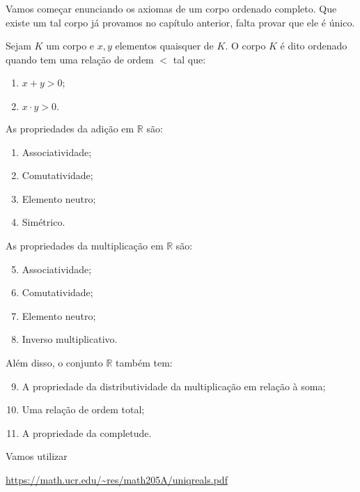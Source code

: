 \documentclass[../main.tex]{subfiles}
\begin{document}
Vamos começar enunciando os axiomas de um corpo ordenado completo. Que existe um tal corpo já provamos no capítulo anterior, falta provar que ele é único.

\begin{defi}\label{enum-def-corpoOrdenado}
    Sejam $K$ um corpo e $x,y$ elementos quaisquer de $K$. O corpo $K$ é dito ordenado quando tem uma relação de ordem $<$ tal que: 
    \begin{enumerate}[label=(\roman*)]
        \item $x+y > 0$;
        \item $x \cdot y > 0.$
    \end{enumerate}
\end{defi}

As propriedades da adição em $\mathbb{R}$ são:
\begingroup
\renewcommand\labelenumi{A\theenumi.}
\begin{enumerate}
    \item Associatividade;
    \item Comutatividade;
    \item Elemento neutro;
    \item Simétrico.
\end{enumerate}

As propriedades da multiplicação em $\mathbb{R}$ são:
\renewcommand\labelenumi{M\theenumi.}
\begin{enumerate}
    \setcounter{enumi}{4}
    \item Associatividade;
    \item Comutatividade;
    \item Elemento neutro;
    \item Inverso multiplicativo.
\end{enumerate}
Além disso, o conjunto $\mathbb{R}$ também tem:
\renewcommand\labelenumi{P\theenumi.}
\begin{enumerate}
\setcounter{enumi}{8}
    \item A propriedade da distributividade da multiplicação em relação à soma;
    \item Uma relação de ordem total;
    \item A propriedade da completude.
\end{enumerate}
\endgroup

\begin{obs}
    Vamos utilizar 
\end{obs}
\url{https://math.ucr.edu/~res/math205A/uniqreals.pdf}
\end{document}
